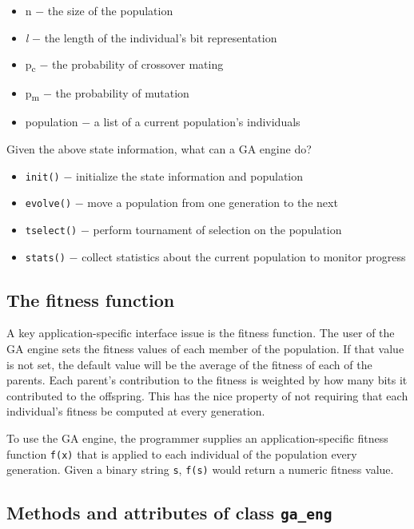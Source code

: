 \begin{itemize}
\item n $-$ the size of the population
\item \textit{l} $-$ the length of the individual's bit
representation
\item p\textsubscript{c} $-$ the probability of crossover mating
\item p\textsubscript{m} $-$ the probability of mutation
\item population $-$ a list of a current population's
individuals
\end{itemize}
Given the above state information, what can a GA engine do?

\begin{itemize}
\item \texttt{init()} $-$ initialize the state information and
population
\item \texttt{evolve()} $-$ move a population from one generation to the
next
\item \texttt{tselect()} $-$ perform tournament of selection on the
population
\item \texttt{stats()} $-$ collect statistics about the current
population to monitor progress
\end{itemize}

\subsection*{The fitness function}

A key application-specific interface issue is the fitness function. The
user of the GA engine sets the fitness values of each member of the
population. If that value is not set, the default value will be the
average of the fitness of each of the parents. Each
parent's contribution to the fitness is weighted by
how many bits it contributed to the offspring. This has the nice
property of not requiring that each individual's
fitness be computed at every generation.

To use the GA engine, the programmer supplies an application-specific
fitness function \texttt{f(x)} that is applied to each individual of
the population every generation. Given a binary string \texttt{s},
\texttt{f(s)} would return a numeric fitness value.

\subsection*{Methods and attributes of class \texttt{ga\_eng}}

